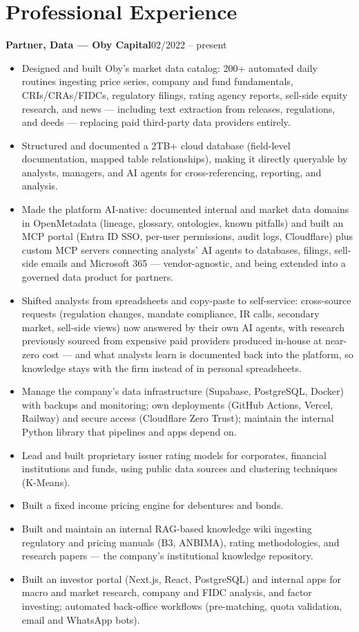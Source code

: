 \documentclass[10pt]{article}
\newcommand{\job}[2]{\textbf{#1}\hfill #2\\[-2pt]}
\begin{document}
\section*{Professional Experience}
\job{Partner, Data --- Oby Capital}{02/2022 -- present}
\begin{itemize}
\item Designed and built Oby's market data catalog: 200+ automated daily routines ingesting price series, company and fund fundamentals, CRIs/CRAs/FIDCs, regulatory filings, rating agency reports, sell-side equity research, and news --- including text extraction from releases, regulations, and deeds --- replacing paid third-party data providers entirely.
\item Structured and documented a 2TB+ cloud database (field-level documentation, mapped table relationships), making it directly queryable by analysts, managers, and AI agents for cross-referencing, reporting, and analysis.
\item Made the platform AI-native: documented internal and market data domains in OpenMetadata (lineage, glossary, ontologies, known pitfalls) and built an MCP portal (Entra ID SSO, per-user permissions, audit logs, Cloudflare) plus custom MCP servers connecting analysts' AI agents to databases, filings, sell-side emails and Microsoft 365 --- vendor-agnostic, and being extended into a governed data product for partners.
\item Shifted analysts from spreadsheets and copy-paste to self-service: cross-source requests (regulation changes, mandate compliance, IR calls, secondary market, sell-side views) now answered by their own AI agents, with research previously sourced from expensive paid providers produced in-house at near-zero cost --- and what analysts learn is documented back into the platform, so knowledge stays with the firm instead of in personal spreadsheets.
\item Manage the company's data infrastructure (Supabase, PostgreSQL, Docker) with backups and monitoring; own deployments (GitHub Actions, Vercel, Railway) and secure access (Cloudflare Zero Trust); maintain the internal Python library that pipelines and apps depend on.
\item Lead and built proprietary issuer rating models for corporates, financial institutions and funds, using public data sources and clustering techniques (K-Means).
\item Built a fixed income pricing engine for debentures and bonds.
\item Built and maintain an internal RAG-based knowledge wiki ingesting regulatory and pricing manuals (B3, ANBIMA), rating methodologies, and research papers --- the company's institutional knowledge repository.
\item Built an investor portal (Next.js, React, PostgreSQL) and internal apps for macro and market research, company and FIDC analysis, and factor investing; automated back-office workflows (pre-matching, quota validation, email and WhatsApp bots).
\end{itemize}
\end{document}
